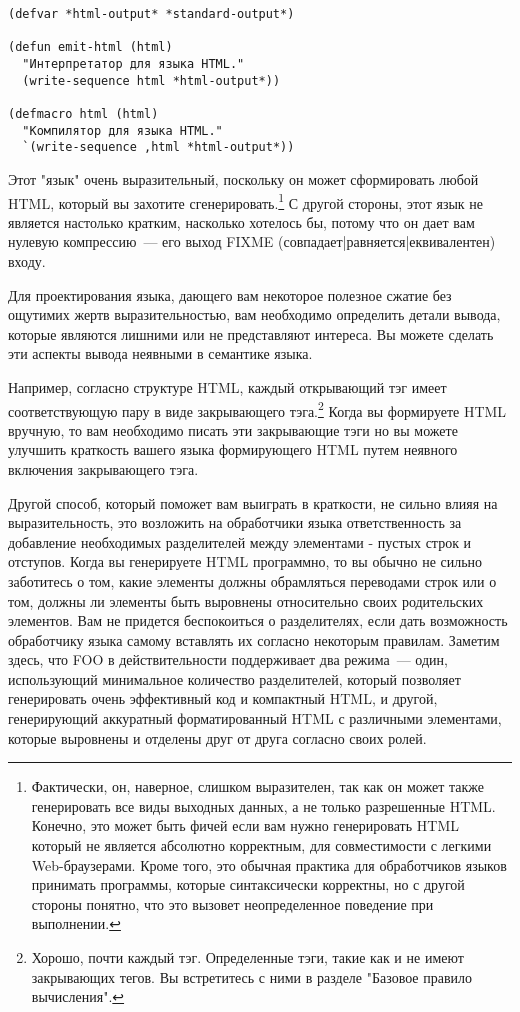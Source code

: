 \begin{lstlisting}
(defvar *html-output* *standard-output*)

(defun emit-html (html)
  "Интерпретатор для языка HTML."
  (write-sequence html *html-output*))

(defmacro html (html)
  "Компилятор для языка HTML."
  `(write-sequence ,html *html-output*))
\end{lstlisting}

Этот "язык" очень выразительный, поскольку он может сформировать любой HTML, который вы
захотите сгенерировать.\footnote{Фактически, он, наверное, слишком выразителен, так как он
  может также генерировать все виды выходных данных, а не только разрешенные
  HTML. Конечно, это может быть фичей если вам нужно генерировать HTML который не является
  абсолютно корректным, для совместимости с легкими Web-браузерами. Кроме того, это
  обычная практика для обработчиков языков принимать программы, которые синтаксически
  корректны, но с другой стороны понятно, что это вызовет неопределенное поведение при
  выполнении.} С другой стороны, этот язык не является настолько кратким, насколько
хотелось бы, потому что он дает вам нулевую компрессию~--- его выход FIXME
(совпадает|равняется|еквивалентен) входу.

Для проектирования языка, дающего вам некоторое полезное сжатие без ощутимих жертв
выразительностью, вам необходимо определить детали вывода, которые являются лишними или не
представляют интереса. Вы можете сделать эти аспекты вывода неявными в семантике языка.

Например, согласно структуре HTML, каждый открывающий тэг имеет соответствующую пару в
виде закрывающего тэга.\footnote{Хорошо, почти каждый тэг. Определенные тэги, такие как
   и  не имеют закрывающих тегов.  Вы встретитесь с ними в разделе
  "Базовое правило вычисления".} Когда вы формируете HTML вручную, то вам необходимо
писать эти закрывающие тэги но вы можете улучшить краткость вашего языка формирующего HTML
путем неявного включения закрывающего тэга.

Другой способ, который поможет вам выиграть в краткости, не сильно влияя на
выразительность, это возложить на обработчики языка ответственность за добавление
необходимых разделителей между элементами - пустых строк и отступов. Когда вы генерируете
HTML программно, то вы обычно не сильно заботитесь о том, какие элементы должны
обрамляться переводами строк или о том, должны ли элементы быть выровнены относительно
своих родительских элементов. Вам не придется беспокоиться о разделителях, если дать
возможность обработчику языка самому вставлять их согласно некоторым правилам. Заметим
здесь, что FOO в действительности поддерживает два режима~--- один, использующий
минимальное количество разделителей, который позволяет генерировать очень эффективный код
и компактный HTML, и другой, генерирующий аккуратный форматированный HTML с различными
элементами, которые выровнены и отделены друг от друга согласно своих ролей.

